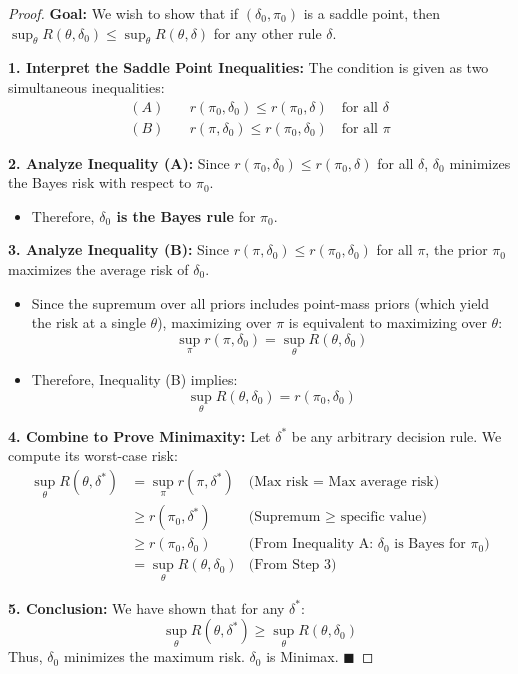 \documentclass[
  letterpaper,
  DIV=11,
  numbers=noendperiod]{scrreprt}
\providecommand{\tightlist}{%
  \setlength{\itemsep}{0pt}\setlength{\parskip}{0pt}}
\renewcommand{\[}{\begin{equation}}
\renewcommand{\]}{\end{equation}}
\theoremstyle{definition}
\theoremstyle{plain}
\theoremstyle{plain}
\theoremstyle{plain}
\theoremstyle{definition}
\theoremstyle{plain}
\theoremstyle{remark}
\begin{document}
\begin{proof}
\textbf{Goal:} We wish to show that if \((\delta_0, \pi_0)\) is a saddle
point, then
\(\sup_{\theta} R(\theta, \delta_0) \le \sup_{\theta} R(\theta, \delta)\)
for any other rule \(\delta\).

\textbf{1. Interpret the Saddle Point Inequalities:} The condition is
given as two simultaneous inequalities: \[
\begin{aligned}
(A) \quad & r(\pi_0, \delta_0) \le r(\pi_0, \delta) \quad \text{for all } \delta \\
(B) \quad & r(\pi, \delta_0) \le r(\pi_0, \delta_0) \quad \text{for all } \pi
\end{aligned}
\]

\textbf{2. Analyze Inequality (A):} Since
\(r(\pi_0, \delta_0) \le r(\pi_0, \delta)\) for all \(\delta\),
\(\delta_0\) minimizes the Bayes risk with respect to \(\pi_0\).

\begin{itemize}
\tightlist
\item
  Therefore, \textbf{\(\delta_0\) is the Bayes rule} for \(\pi_0\).
\end{itemize}

\textbf{3. Analyze Inequality (B):} Since
\(r(\pi, \delta_0) \le r(\pi_0, \delta_0)\) for all \(\pi\), the prior
\(\pi_0\) maximizes the average risk of \(\delta_0\).

\begin{itemize}
\item
  Since the supremum over all priors includes point-mass priors (which
  yield the risk at a single \(\theta\)), maximizing over \(\pi\) is
  equivalent to maximizing over \(\theta\):
  \[ \sup_{\pi} r(\pi, \delta_0) = \sup_{\theta} R(\theta, \delta_0) \]
\item
  Therefore, Inequality (B) implies:
  \[ \sup_{\theta} R(\theta, \delta_0) = r(\pi_0, \delta_0) \]
\end{itemize}

\textbf{4. Combine to Prove Minimaxity:} Let \(\delta^*\) be any
arbitrary decision rule. We compute its worst-case risk: \[
\begin{aligned}
\sup_{\theta} R(\theta, \delta^*) &= \sup_{\pi} r(\pi, \delta^*) & \text{(Max risk = Max average risk)} \\
&\ge r(\pi_0, \delta^*) & \text{(Supremum $\ge$ specific value)} \\
&\ge r(\pi_0, \delta_0) & \text{(From Inequality A: $\delta_0$ is Bayes for $\pi_0$)} \\
&= \sup_{\theta} R(\theta, \delta_0) & \text{(From Step 3)}
\end{aligned}
\]

\textbf{5. Conclusion:} We have shown that for any \(\delta^*\):
\[ \sup_{\theta} R(\theta, \delta^*) \ge \sup_{\theta} R(\theta, \delta_0) \]
Thus, \(\delta_0\) minimizes the maximum risk. \(\delta_0\) is Minimax.
\(\blacksquare\)
\end{proof}
\end{document}
